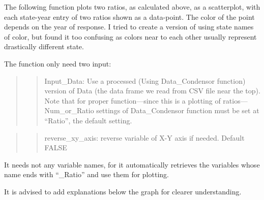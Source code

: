\documentclass[
]{article}
\begin{document}
The following function plots two ratios, as calculated above, as a
scatterplot, with each state-year entry of two ratios shown as a
data-point. The color of the point depends on the year of response. I
tried to create a version of using state names of color, but found it
too confusing as colors near to each other usually represent drastically
different state.

The function only need two input:

\begin{quote}
\begin{quote}
Input\_Data: Use a processed (Using Data\_Condensor function) version of
Data (the data frame we read from CSV file near the top). Note that for
proper function---since this is a plotting of ratios---Num\_or\_Ratio
settings of Data\_Condensor function must be set at ``Ratio'', the
default setting.
\end{quote}
\end{quote}

\begin{quote}
\begin{quote}
reverse\_xy\_axis: reverse variable of X-Y axis if needed. Default FALSE
\end{quote}
\end{quote}

It needs not any variable names, for it automatically retrieves the
variables whose name ends with ``\_Ratio'' and use them for plotting.

It is advised to add explanations below the graph for clearer
understanding.
\end{document}
